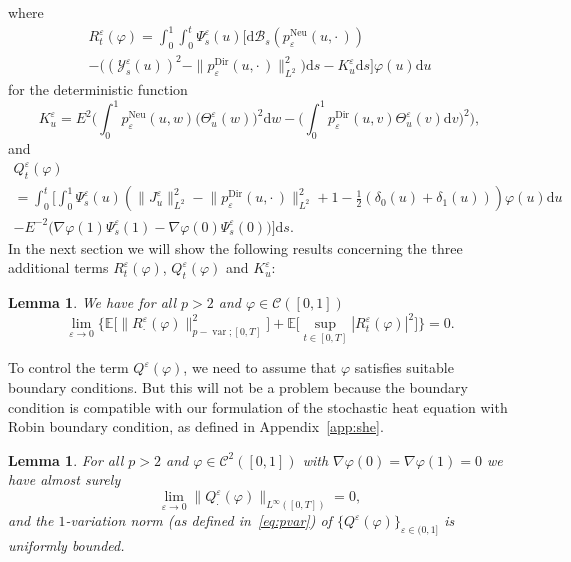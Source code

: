 \documentclass[10pt]{amsart}
\newtheorem{lemm}[theo]{Lemma}\newtheorem{prop}[theo]{Proposition}\newtheorem{coro}[theo]{Corollary}\newtheorem{conj}[theo]{Conjecture}
\theoremstyle{definition}\newtheorem{defi}[theo]{Definition}\newtheorem{rema}[theo]{Remark}\newtheorem{exam}[theo]{Example}\newtheorem{exem}[theo]{Example}\newtheorem{nota}[theo]{Notation}
\DeclareMathOperator{\Dir}{Dir}
\DeclareMathOperator{\Neu}{Neu}
\DeclareMathOperator{\var}{var}
\newcommand{\mc}[1]{{\mathcal #1}}
\renewcommand{\mc}[1]{{\mathcal #1}}
\newcommand*{\dd}{\mathrm{d}}
\newcommand*{\ds}{\dd s}
\newcommand*{\du}{\dd u}
\newcommand*{\dv}{\dd v}
\newcommand*{\dw}{\dd w}
\renewcommand{\tfrac}{\frac}
\begin{document}
where
\begin{multline}\label{eq:remainder-1}
R^{\varepsilon}_t (\varphi) = \int_0^1 \int_0^t \Psi^{\varepsilon}_s (u) \Big[\dd \mathcal{B}_s (p^{\Neu}_{\varepsilon} (u, \cdot\,)) \\
-\big((\mc Y^{\varepsilon}_s (u))^2 -\|p^{\Dir}_{\varepsilon} (u, \cdot\,) \|_{L^2}^2\big) \ds - K^{\varepsilon}_u \ds\Big] \varphi (u) \du
\end{multline}
for the deterministic function
\begin{equation}\label{eq:K-def}
K^{\varepsilon}_u = E^2 \bigg(\int_0^1 p^{\Neu}_{\varepsilon} (u, w) \big(\Theta^{\varepsilon}_u (w)\big)^2 \dw - \bigg(\int_0^1 p^{\Dir}_{\varepsilon} (u, v) \Theta^{\varepsilon}_u (v) \dv \bigg)^2 \bigg),
\end{equation}
and
\begin{multline}\label{eq:remainder-2}
Q^{\varepsilon}_t (\varphi)\\ = \int_0^t \bigg[\int_0^1
\Psi^{\varepsilon}_s (u) \left(\big\| J^{\varepsilon}_u \big\|_{L^2}^2 - \big\| p^{\Dir}_{\varepsilon} (u, \cdot\,) \big\|_{L^2}^2 + 1 - \tfrac12 (\delta_0(u) + \delta_1(u)) \right) \varphi (u) \du \\ - E^{- 2} \big(\nabla \varphi (1) \Psi^{\varepsilon}_s (1) - \nabla \varphi (0) \Psi^{\varepsilon}_s (0)\big) \bigg] \ds.
\end{multline}
In the next section we will show the following results concerning the three additional terms $R_t^\varepsilon(\varphi)$, $Q_t^\varepsilon(\varphi)$ and $K_u^\varepsilon$:

\begin{lemm}\label{lem:remainder-1}
We have for all $p > 2$ and $\varphi \in \mc C([0, 1])$
\begin{equation}\label{eq:Rvan}
\lim_{\varepsilon \rightarrow 0} \Big\{ \mathbb{E} \big[\| R^{\varepsilon}_\cdot
(\varphi) \|_{p - \var ; [0, T]}^2\big] +\mathbb{E} \Big[\sup_{t \in[0,T]} | R^{\varepsilon}_t (\varphi) |^2\Big] \Big\} = 0.
\end{equation}
\end{lemm}

To control the term $Q^\varepsilon(\varphi)$, we need to assume that $\varphi$ satisfies suitable boundary conditions. But this will not be a problem because the boundary condition is compatible with our formulation of the stochastic heat equation with Robin boundary condition, as defined in Appendix~\ref{app:she}.

\begin{lemm}\label{lem:remainder-2}
For all $p > 2$ and $\varphi \in \mc C^2([0,1])$ with $\nabla \varphi(0) = \nabla \varphi(1) = 0$ we have almost surely
\[
\lim_{\varepsilon \rightarrow 0} \big\| Q^{\varepsilon}_\cdot (\varphi) \big\|_{L^\infty([0,T])} = 0,
\]
and the $1$-variation norm (as defined in~\eqref{eq:pvar}) of $\big\{Q^\varepsilon(\varphi)\big\}_{\varepsilon \in (0,1]}$ is uniformly bounded.
\end{lemm}
\end{document}
